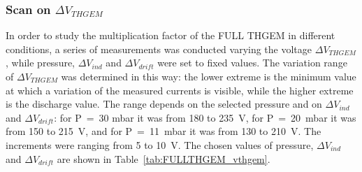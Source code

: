 \documentclass[a4paper, 11 pt]{article}
\newcommand{\Vind}{$\Delta V_{ind}$}
\newcommand{\Vthgem}{$\Delta V_{THGEM}$}
\newcommand{\Vdrift}{$ \Delta V_{drift}$}
\begin{document}






\clearpage

\subsubsection{Scan on \Vthgem}

In order to study the multiplication factor of the FULL THGEM in different conditions, a series of measurements was conducted varying the voltage \Vthgem, while pressure, \Vind{} and \Vdrift{} were set to fixed values.
The variation range of \Vthgem{} was determined in this way: the lower extreme is the minimum value at which a variation of the measured currents is visible, while the higher extreme is the discharge value.
The range depends on the selected pressure and on \Vind{} and \Vdrift: for P~=~30 mbar it was from 180 to 235~V, for P~=~20~mbar it was from 150 to 215~V, and for P~=~11~mbar it was from 130 to 210~V.
The increments were ranging from 5 to 10~V.
The chosen values of pressure, \Vind{} and \Vdrift{} are shown in Table~\ref{tab:FULLTHGEM_vthgem}.
\end{document}
